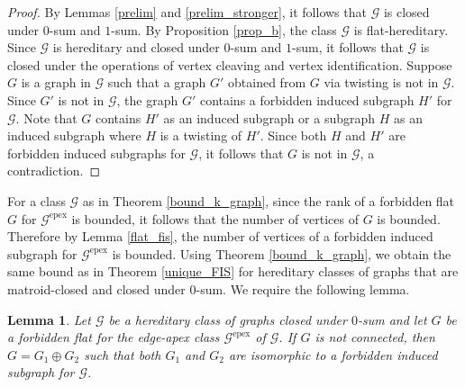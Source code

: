 \documentclass[11pt]{amsart}
\newtheorem{lemma}[theorem]{Lemma}
\theoremstyle{definition}
\theoremstyle{remark}
\numberwithin{equation}{section}
\newcommand\Ga{\mathcal{G}^\mathrm{epex}}
\begin{document}
\begin{proof}
By Lemmas \ref{prelim} and \ref{prelim_stronger}, it follows that $\mathcal{G}$ is closed under $0$-sum and $1$-sum. By Proposition \ref{prop_b}, the class $\mathcal{G}$ is flat-hereditary. Since $\mathcal{G}$ is hereditary and closed under $0$-sum and $1$-sum, it follows that $\mathcal{G}$ is closed under the operations of vertex cleaving and vertex identification. Suppose $G$ is a graph in $\mathcal{G}$ such that a graph $G'$ obtained from $G$ via twisting is not in $\mathcal{G}$. Since $G'$ is not in $\mathcal{G}$, the graph $G'$ contains a forbidden induced subgraph $H'$ for $\mathcal{G}$. Note that $G$ contains $H'$ as an induced subgraph or a subgraph $H$ as an induced subgraph where $H$ is a twisting of $H'$. Since both $H$ and $H'$ are forbidden induced subgraphs for $\mathcal{G}$, it follows that $G$ is not in $\mathcal{G}$, a contradiction.
\end{proof}


For a class $\mathcal{G}$ as in Theorem \ref{bound_k_graph}, since the rank of a forbidden flat $G$ for $\Ga$ is bounded, it follows that the number of vertices of $G$ is bounded. Therefore by Lemma \ref{flat_fis}, the number of vertices of a forbidden induced subgraph for $\Ga$ is bounded.
Using Theorem \ref{bound_k_graph},  we obtain the same bound as in Theorem \ref{unique_FIS} for hereditary classes of graphs that are matroid-closed and closed under $0$-sum. We require the following lemma. 



\begin{lemma}
\label{point_wala}
Let $\mathcal{G}$ be a hereditary class of graphs closed under $0$-sum and let $G$ be a forbidden flat for the edge-apex class $\Ga$ of $\mathcal{G}$. If $G$ is not connected, then $G = G_1 \oplus G_2$ such that both $G_1$ and $G_2$ are isomorphic to a forbidden induced subgraph for $\mathcal{G}$.
\end{lemma}
\end{document}
